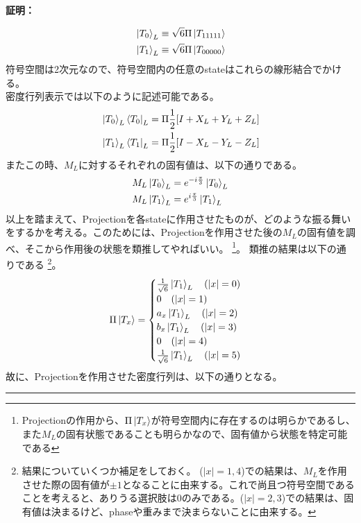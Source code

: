 \documentclass[a4paper,10.5pt]{article}
\numberwithin{equation}{section}
\newenvironment{proofbox}
{\begin{prooflabel}\textbf{証明：}\end{prooflabel}\vspace{0.8em}}
{\par\vspace{1em}\hrule\vspace{1em}}
\begin{document}
\begin{proofbox}
\begin{enumerate}
\begin{align*}
        &\ket{T_{0}}_{L}\equiv \sqrt{6}\Pi \ket{T_{11111}}\\
        &\ket{T_{1}}_{L}\equiv \sqrt{6}\Pi \ket{T_{00000}}
    \end{align*}
    符号空間は2次元なので、符号空間内の任意のstateはこれらの線形結合でかける。\\
    密度行列表示では以下のように記述可能である。
    \begin{align*}
        &\ket{T_{0}}_{L}\bra{T_{0}}_{L}=\Pi \frac{1}{2}[I+X_{L}+Y_{L}+Z_{L}]\\
        &\ket{T_{1}}_{L}\bra{T_{1}}_{L}=\Pi \frac{1}{2}[I-X_{L}-Y_{L}-Z_{L}]
    \end{align*}
    またこの時、$M_{L}$に対するそれぞれの固有値は、以下の通りである。
    \begin{align*}
        &M_{L}\ket{T_{0}}_{L}=e^{-i\frac{\pi}{3}}\ket{T_{0}}_{L}\\
        &M_{L}\ket{T_{1}}_{L}=e^{i\frac{\pi}{3}}\ket{T_{1}}_{L}\\
    \end{align*}
    以上を踏まえて、Projectionを各stateに作用させたものが、どのような振る舞いをするかを考える。このためには、Projectionを作用させた後の$M_{L}$の固有値を調べ、そこから作用後の状態を類推してやればいい。
    \footnote{Projectionの作用から、$\Pi\ket{T_{x}}$が符号空間内に存在するのは明らかであるし、また$M_{L}$の固有状態であることも明らかなので、固有値から状態を特定可能である}。
    類推の結果は以下の通りである
    \footnote{結果についていくつか補足をしておく。
    ($|x|=1,4$)での結果は、$M_{L}$を作用させた際の固有値が$\pm 1$となることに由来する。これで尚且つ符号空間であることを考えると、ありうる選択肢は0のみである。($|x|=2,3$)での結果は、固有値は決まるけど、phaseや重みまで決まらないことに由来する。}。
    \begin{align*}
        \Pi\ket{T_{x}}=
        \begin{cases}
        \frac{1}{\sqrt{6}}\ket{T_{1}}_{L}\quad (|x|=0)    \\
        0  \quad (|x|=1)\\
        a_{x}\ket{T_{1}}_{L}\quad (|x|=2)    \\
        b_{x}\ket{T_{1}}_{L}\quad (|x|=3)    \\
        0\quad (|x|=4)    \\
        \frac{1}{\sqrt{6}}\ket{T_{1}}_{L}\quad (|x|=5)    
        \end{cases}
    \end{align*}
    故に、Projectionを作用させた密度行列は、以下の通りとなる。

\end{enumerate}
\end{proofbox}
\end{document}
